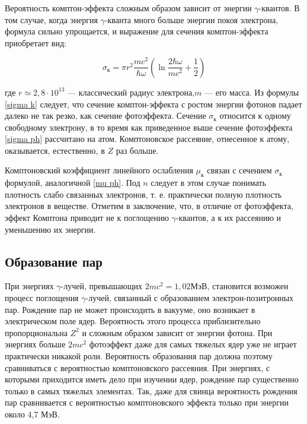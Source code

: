 \documentclass[a4paper,12pt]{extarticle}
\begin{document}
	Вероятность комптон-эффекта сложным образом зависит от энергии $\gamma$-квантов. В том случае, когда энергия
	$\gamma$-кванта много больше энергии покоя электрона, формула сильно
	упрощается, и выражение для сечения комптон-эффекта приобретает  вид:
	
	\begin{equation}\label{sigma k}
	\sigma_{\text{к}} = \pi r^2 \dfrac{mc^2}{\hbar\omega} \left( \ln{\dfrac{2\hbar\omega}{mc^2} + \dfrac{1}{2}} \right) 
	\end{equation}
	
	где $ r \simeq 2,8 \cdot 10^{13} $ --- классический радиус электрона,$ m $ --- его масса. Из формулы \eqref{sigma k} следует, что сечение комптон-эффекта с ростом энергии фотонов падает далеко не так резко, как сечение фотоэффекта.
	Сечение $ \sigma_{\text{к}} $ относится к одному свободному электрону, в то время как приведенное выше сечение фотоэффекта \eqref{sigma ph} рассчитано на атом.
	Комптоновское рассеяние, отнесенное к атому, оказывается, естественно, в $ Z $ раз больше. 
	
	Комптоновский коэффициент линейного ослабления $ \mu_{\text{к}} $ связан с
	сечением $ \sigma_{\text{к}} $ формулой, аналогичной \eqref{mu ph}. Под $ n $ следует в этом случае понимать плотность слабо связанных электронов, т. е. практически полную плотность электронов в веществе.
	Отметим в заключение, что, в отличие от фотоэффекта, эффект
	Комптона приводит не к поглощению $\gamma$-квантов, а к их рассеянию и
	уменьшению их энергии.
	
	\subsection*{Образование пар}
	
	 При энергиях $\gamma$-лучей, превышающих $ 2mc^2 = 1,02  $МэВ, становится возможен процесс поглощения $\gamma$-лучей, связанный с образованием электрон-позитронных пар. Рождение пар не
	может происходить в вакууме, оно возникает в электрическом поле
	ядер. Вероятность этого процесса приблизительно пропорциональна
	$ Z^2  $ и сложным образом зависит от энергии фотона. При энергиях больше $ 2mc^2  $ фотоэффект даже для самых тяжелых ядер уже не играет
	практически никакой роли. Вероятность образования пар должна поэтому сравниваться с вероятностью комптоновского рассеяния. При
	энергиях, с которыми приходится иметь дело при изучении ядер, рождение пар существенно только в самых тяжелых элементах. Так, даже
	для свинца вероятность рождения пар сравнивается с вероятностью
	комптоновского эффекта только при энергии около 4,7 МэВ.
\end{document}
